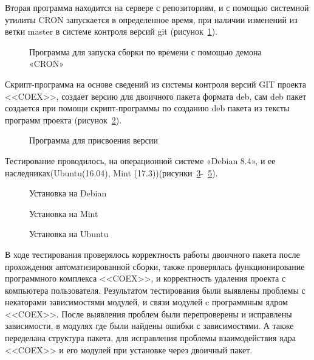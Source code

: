 Вторая программа находится на сервере с репозиториям, и с помощью системной утилиты CRON запускается в определенное время, при наличии изменений из ветки master в системе контроля версий git (рисунок~\ref{ser_2:ser_2}).

\begin{figure}[!ht]
\caption{ Программа  для запуска сборки по времени  с помощью демона  «CRON» }
\label{ser_2:ser_2}
\end{figure}

Скрипт-программа на основе сведений из системы контроля версий GIT проекта <<COEX>>, создает версию для двоичного пакета формата deb, сам deb пакет создается при помощи скрипт-программы по созданию  deb пакета из тексты программ проекта (рисунок~\ref{ser_3:ser_3}).

\begin{figure}[!ht]
\caption{ Программа для присвоения версии }
\label{ser_3:ser_3}
\end{figure}

Тестирование проводилось, на операционной системе «Debian 8.4», и ее наследниках(Ubuntu(16.04), Mint (17.3))(рисунки~\ref{ser_4:ser_4}-~\ref{ser_6:ser_6}).

\begin{figure}[!ht]
\caption{ Установка на Debian }
\label{ser_4:ser_4}
\end{figure}

\begin{figure}[!ht]
\caption{ Установка на Mint }
\label{ser_5:ser_5}
\end{figure}

\begin{figure}[!ht]
\caption{ Установка на Ubuntu }
\label{ser_6:ser_6}
\end{figure}

В ходе тестирования проверялось корректность работы двоичного пакета после прохождения автоматизированной сборки, также проверялась функционирование программного комплекса <<COEX>>, и корректность удаления проекта с компьютера пользователя. Результатом тестирования были выявлены проблемы с некаторами зависимостями модулей, и связи модулей c программным ядром <<COEX>>. После выявления проблем были перепроверены и исправлены зависимости, в модулях где были найдены ошибки с зависимостями. А также переделана структура пакета, для исправления проблемы взаимодействия ядра <<COEX>> и его модулей при установке через двоичный пакет.  

\clearpage
